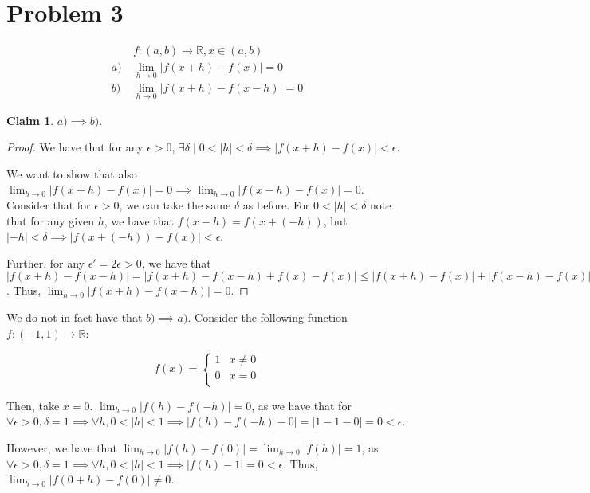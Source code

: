 \documentclass[12pt,letterpaper]{article}
\theoremstyle{definition}
\newtheorem*{claim}{Claim}
\newcommand{\R}{\mathbb{R}}
\begin{document}
\section*{Problem 3}

\begin{align*}
  &f:(a,b) \rightarrow \R, x \in (a,b) \\
  a) \ &\lim_{h\rightarrow 0}|f(x + h) - f(x)| = 0 \\
  b) \ &\lim_{h\rightarrow 0}|f(x + h) - f(x - h)| = 0
\end{align*}

\begin{claim}
  $a) \implies b)$.
\end{claim}

\begin{proof}
  We have that for any $\epsilon > 0$, $\exists \delta \mid 0 < |h| < \delta
  \implies |f(x+h) - f(x)| < \epsilon$.

  We want to show that also $\lim_{h\rightarrow 0}|f(x + h) - f(x)| = 0 \implies
  \lim_{h\rightarrow 0}|f(x - h) -f(x)| = 0$. Consider that for $\epsilon > 0$,
  we can take the same $\delta$ as before. For $0 < |h| < \delta$ note that for
  any given $h$, we have that $f(x-h) =
  f(x+(-h))$, but $|-h| < \delta \implies |f(x + (-h)) - f(x)| < \epsilon$.
  
  Further, for any $\epsilon' = 2\epsilon > 0$, we have that $|f(x + h) - f(x - h)| = |f(x +
  h) - f(x - h) + f(x) - f(x)| \leq |f(x + h) - f(x)| + |f(x -h) - f(x)| <
  2\epsilon = \epsilon'$. Thus, $\lim_{h\rightarrow 0}|f(x+h)-f(x-h)| = 0$.
\end{proof}

We do not in fact have that $b) \implies a)$. Consider the following function
$f:(-1,1) \rightarrow \R$:

\[
  f(x) = \begin{cases}
    1 & x \neq 0 \\
    0 & x = 0 \\
  \end{cases}
\]

Then, take $x = 0$. $\lim_{h\rightarrow 0}|f(h) - f(-h)| = 0$, as we have that
for $\forall \epsilon > 0, \delta = 1 \implies \forall h, 0 < |h| < 1 \implies |f(h) -
f(-h) - 0| = |1-1 - 0| = 0 < \epsilon$.

However, we have that $\lim_{h\rightarrow 0}|f(h) - f(0)| = \lim_{h\rightarrow
  0}|f(h)| = 1$, as $\forall \epsilon > 0, \delta = 1 \implies \forall h, 0 <
|h| < 1 \implies |f(h) - 1| = 0 < \epsilon$. Thus, $\lim_{h\rightarrow
  0}|f(0+h) - f(0)| \neq 0$.
\end{document}

